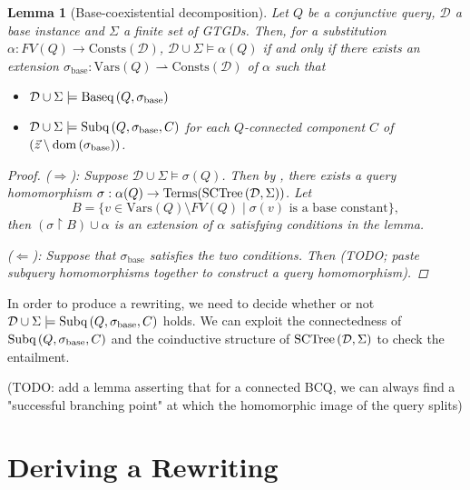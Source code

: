 \documentclass[12pt]{report}
\theoremstyle{plain}
\newtheorem{lemma}[theorem]{Lemma}
\theoremstyle{definition}
\def\Vars{{\mathrm{Vars}}}
\def\Consts{{\mathrm{Consts}}}
\def\Terms{{\mathrm{Terms}}}
\newcommand{\dom}[1]{\ensuremath{\normalfont{\operatorname{dom}} \left( #1 \right)}}
\newcommand{\SCTree}[2]{\ensuremath{\normalfont{\textrm{SCTree}} \left( #1, #2 \right)}}
\newcommand{\Subq}[3]{\ensuremath{\normalfont{\textrm{Subq}} \left( #1, #2, #3 \right)}}
\newcommand{\Baseq}[2]{\ensuremath{\normalfont{\textrm{Baseq}} \left( #1, #2 \right)}}
\begin{document}
\begin{lemma}[Base-coexistential decomposition]
\label{base-coexistential}
  Let $Q$ be a conjunctive query, $\mathcal{D}$ a base instance and $\Sigma$ a finite set of GTGDs. Then, for a substitution\newline $\alpha: FV(Q) \rightarrow \Consts(\mathcal{D})$, $\mathcal{D} \cup \Sigma \models \alpha(Q)$ if and only if there exists an extension $\sigma_\mathrm{base}: \Vars(Q) \rightharpoonup \Consts(\mathcal{D})$ of $\alpha$ such that
  \begin{itemize}
    \item $\mathcal{D} \cup \Sigma \models \Baseq{Q}{\sigma_\mathrm{base}}$
    \item $\mathcal{D} \cup \Sigma \models \Subq{Q}{\sigma_\mathrm{base}}{C}$ for each $Q$-connected component $C$ of \newline $(\vec{z} \setminus\nobreak \mathrm{\dom{\sigma_\mathrm{base}}})$.
  \end{itemize}
  \begin{proof}
    ($\Longrightarrow$): Suppose $\mathcal{D} \cup \Sigma \models \sigma(Q)$. Then by , there exists a query homomorphism $\sigma: \alpha(Q) \rightarrow \Terms(\SCTree{\mathcal{D}}{\Sigma})$. Let $$B = \{ v \in \Vars(Q) \setminus FV(Q) \mid \sigma(v) \text{ is a base constant} \},$$ then $(\sigma \upharpoonright B) \cup \alpha$ is an extension of $\alpha$ satisfying conditions in the lemma.

    ($\Longleftarrow$): Suppose that $\sigma_\mathrm{base}$ satisfies the two conditions. Then (TODO; paste subquery homomorphisms together to construct a query homomorphism).
  \end{proof}
\end{lemma}


In order to produce a rewriting, we need to decide whether or not $\mathcal{D} \cup \Sigma \models \Subq{Q}{\sigma_\mathrm{base}}{C}$ holds. We can exploit the connectedness of $\Subq{Q}{\sigma_\mathrm{base}}{C}$ and the coinductive structure of $\SCTree{\mathcal{D}}{\Sigma}$ to check the entailment.

(TODO: add a lemma asserting that for a connected BCQ, we can always find a "successful branching point" at which the homomorphic image of the query splits)

\newpage
\chapter{Deriving a Rewriting}\label{deriving-a-rewriting}
\end{document}
